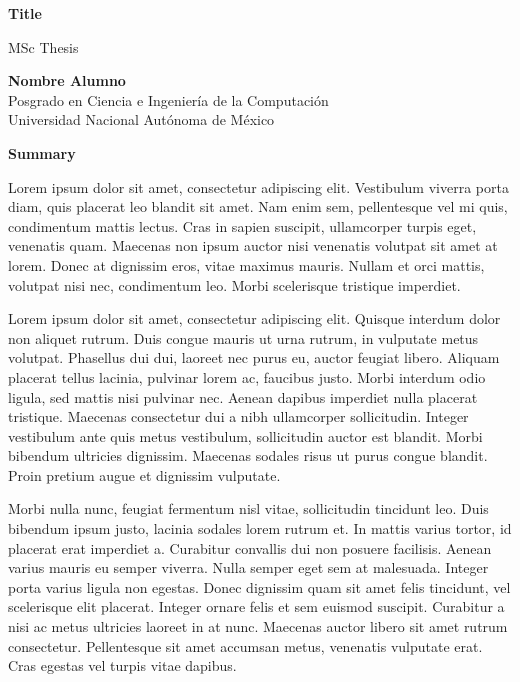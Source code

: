 
\begin{center}
\large{\bf Title}

\normalsize{MSc Thesis}\\
\vspace{0.5cm}

\normalsize{\bf Nombre Alumno}\\
Posgrado en Ciencia e Ingeniería de la Computación\\
Universidad Nacional Autónoma de México

\vspace{1.0cm}

\large{\textbf{Summary\\}}

\end{center}
\everypar{}%
Lorem ipsum dolor sit amet, consectetur adipiscing elit. Vestibulum viverra porta diam, quis placerat leo blandit sit amet. Nam enim sem, pellentesque vel mi quis, condimentum mattis lectus. Cras in sapien suscipit, ullamcorper turpis eget, venenatis quam. Maecenas non ipsum auctor nisi venenatis volutpat sit amet at lorem. Donec at dignissim eros, vitae maximus mauris. Nullam et orci mattis, volutpat nisi nec, condimentum leo. Morbi scelerisque tristique imperdiet.

Lorem ipsum dolor sit amet, consectetur adipiscing elit. Quisque interdum dolor non aliquet rutrum. Duis congue mauris ut urna rutrum, in vulputate metus volutpat. Phasellus dui dui, laoreet nec purus eu, auctor feugiat libero. Aliquam placerat tellus lacinia, pulvinar lorem ac, faucibus justo. Morbi interdum odio ligula, sed mattis nisi pulvinar nec. Aenean dapibus imperdiet nulla placerat tristique. Maecenas consectetur dui a nibh ullamcorper sollicitudin. Integer vestibulum ante quis metus vestibulum, sollicitudin auctor est blandit. Morbi bibendum ultricies dignissim. Maecenas sodales risus ut purus congue blandit. Proin pretium augue et dignissim vulputate.

Morbi nulla nunc, feugiat fermentum nisl vitae, sollicitudin tincidunt leo. Duis bibendum ipsum justo, lacinia sodales lorem rutrum et. In mattis varius tortor, id placerat erat imperdiet a. Curabitur convallis dui non posuere facilisis. Aenean varius mauris eu semper viverra. Nulla semper eget sem at malesuada. Integer porta varius ligula non egestas. Donec dignissim quam sit amet felis tincidunt, vel scelerisque elit placerat. Integer ornare felis et sem euismod suscipit. Curabitur a nisi ac metus ultricies laoreet in at nunc. Maecenas auctor libero sit amet rutrum consectetur. Pellentesque sit amet accumsan metus, venenatis vulputate erat. Cras egestas vel turpis vitae dapibus.

